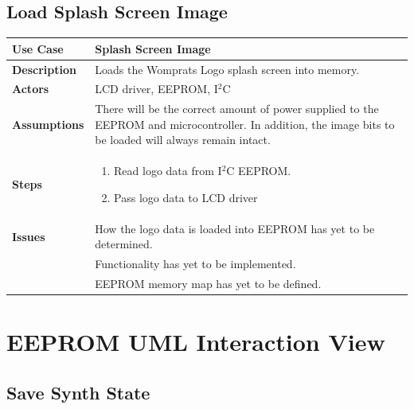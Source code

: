 \documentclass{article}
\begin{document}
\subsection{Load Splash Screen Image}
\begin{tabular}{|p{1in}|p{5in}|}
\hline
\textbf{Use Case} & Splash Screen Image\\
\hline
\textbf{Description} & Loads the Womprats Logo splash screen into memory.\\
\hline
\textbf{Actors} & LCD driver, EEPROM, I$^2$C\\
\hline
\textbf{Assumptions} & There will be the correct amount of power supplied to the EEPROM and microcontroller.  In addition, the image bits to be loaded will always remain intact.\\
\hline
\textbf{Steps} & \begin{enumerate}
\item Read logo data from I$^2$C EEPROM.
\item Pass logo data to LCD driver
\end{enumerate}\\
\hline
\textbf{Issues} & How the logo data is loaded into EEPROM has yet to be determined.\\
& Functionality has yet to be implemented.\\
& EEPROM memory map has yet to be defined.\\
\hline
\end{tabular}

\section{EEPROM UML Interaction View}
\subsection{Save Synth State}
\end{document}

